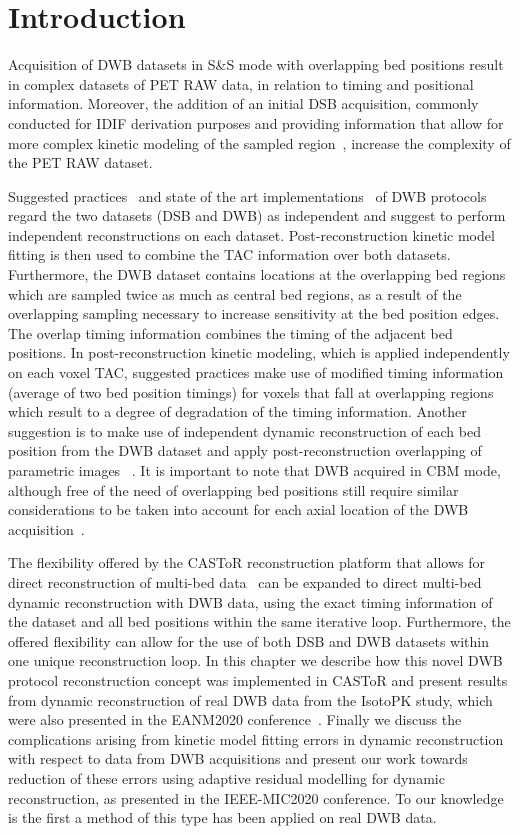 \section{Introduction}
Acquisition of DWB datasets in S\&S mode with overlapping bed positions result in complex datasets of PET RAW data, in relation to timing and positional information. Moreover, the addition of an initial DSB acquisition, commonly conducted for IDIF derivation purposes and providing information that allow for more complex kinetic modeling of the sampled region~\cite{Zaker2020}, increase the complexity of the PET RAW dataset. 

Suggested practices~\cite{Karakatsanis2013} and state of the art implementations~\cite{Hu2020} of DWB protocols regard the two datasets (DSB and DWB) as independent and suggest to perform independent reconstructions on each dataset. Post-reconstruction kinetic model fitting is then used to combine the TAC information over both datasets. 
Furthermore, the DWB dataset contains locations at the overlapping bed regions which are sampled twice as much as central bed regions, as a result of the overlapping sampling necessary to increase sensitivity at the bed position edges. The overlap timing information combines the timing of the adjacent bed positions. In post-reconstruction kinetic modeling, which is applied independently on each voxel TAC, suggested practices make use of modified timing information (average of two bed position timings) for voxels that fall at overlapping regions~\cite{Karakatsanis2013} which result to a degree of degradation of the timing information. Another suggestion is to make use of independent dynamic reconstruction of each bed position from the DWB dataset and apply post-reconstruction overlapping of parametric images ~\cite{Karakatsanis2016a}.
It is important to note that DWB acquired in CBM mode, although free of the need of overlapping bed positions still require similar considerations to be taken into account for each axial location of the DWB acquisition~\cite{Karakatsanis2016b,Hu2020}.

The flexibility offered by the CASToR reconstruction platform that allows for direct reconstruction of multi-bed data~\cite{Ross2004} can be expanded to direct multi-bed dynamic reconstruction with DWB data, using the exact timing information of the dataset and all bed positions within the same iterative loop. Furthermore, the offered flexibility can allow for the use of both DSB and DWB datasets within one unique reconstruction loop.
In this chapter we describe how this novel DWB protocol reconstruction concept was implemented in CASToR and present results from dynamic reconstruction of real DWB data from the IsotoPK study, which were also presented in the EANM2020 conference~\cite{chalampalakis2020EANM}.
Finally we discuss the complications arising from kinetic model fitting errors in dynamic reconstruction with respect to data from DWB acquisitions and present our work towards reduction of these errors using adaptive residual modelling for dynamic reconstruction, as presented in the IEEE-MIC2020 conference. To our knowledge is the first a method of this type has been applied on real DWB data.

